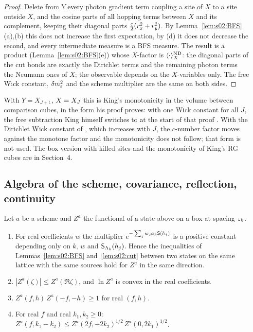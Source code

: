 \begin{proof}
Delete from $Y$ every photon gradient term coupling a site of $X$ to a site outside $X$, and the cosine parts of all hopping terms between $X$ and its complement, keeping their diagonal parts $\frac{\varepsilon}2(r_x^2+r_y^2)$. By Lemma~\ref{lem:s02:BFS}(a),(b) this does not increase the first expectation, by (d) it does not decrease the second, and every intermediate measure is a BFS measure. The result is a product (Lemma~\ref{lem:s02:BFS}(e)) whose $X$-factor is $\langle\cdot\rangle^{\mathrm{ND}}_X$: the diagonal parts of the cut bonds are exactly the Dirichlet terms and the remaining photon terms the Neumann ones of $X$; the observable depends on the $X$-variables only. The free Wick constant, $\delta m^2_{\varepsilon}$ and the scheme multiplier are the same on both sides.
\end{proof}

With $Y=X_{J+1}$, $X=X_J$ this is King's monotonicity in the volume \cite[Thm.~3.2, (3.31)--(3.33)]{K2} between comparison cubes, in the form his proof proves: with one Wick constant for all $J$, the free subtraction King himself switches to at the start of that proof \cite[p.~333]{K2}. With the Dirichlet Wick constant of \cite[(2.13)]{K2}, which increases with $J$, the $c$-number factor moves against the monotone factor and the monotonicity does not follow; that form is not used. The box version with killed sites and the monotonicity of King's RG cubes are in Section~4.

\subsection{Algebra of the scheme, covariance, reflection, continuity}

\begin{lemma}\label{lem:s02:alg}
Let $a$ be a scheme and $Z^a$ the functional of a state above on a box at spacing $\varepsilon_k$.
\begin{enumerate}[label=\textup{(\alph*)},nosep]
\item For real coefficients $w$ the multiplier $e^{-\sum_jw_ja_k\mathsf S(h_j)}$ is a positive constant depending only on $k$, $w$ and $\mathsf S_{\Lambda_k}(h_j)$. Hence the inequalities of Lemmas~\ref{lem:s02:BFS} and~\ref{lem:s02:cut} between two states on the same lattice with the same sources hold for $Z^a$ in the same direction.
\item[(d)] $|Z^a(\zeta)|\le Z^a(\Re\zeta)$, and $\ln Z^a$ is convex in the real coefficients.
\item[(e)] $Z^a(f,h)\,Z^a(-f,-h)\ge1$ for real $(f,h)$.
\item[(f)] For real $f$ and real $k_1,k_2\ge0$: $Z^a(f,k_1-k_2)\le Z^a(2f,-2k_2)^{1/2}\,Z^a(0,2k_1)^{1/2}$.
\end{enumerate}
\end{lemma}

